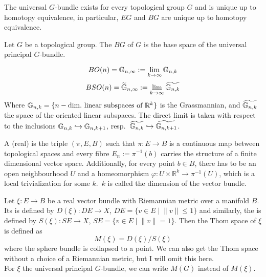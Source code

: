 \documentclass[a4paper,11pt]{article}
\begin{document}
\begin{remark}
    The universal \(G\)-bundle exists for every topological group \(G\) and is unique up to homotopy equivalence, in particular, \(EG\) and \(BG\) are unique up to homotopy equivalence.
\end{remark}

\begin{definition}
    Let \(G\) be a topological group. The  \(BG\) of \(G\) is the base space of the universal principal \(G\)-bundle.
\end{definition}

\begin{remark}\cite[p.32]{thom}
    \[BO(n)=\mathbb{G}_{n,\infty}:=\lim_{k\to\infty}\mathbb{G}_{n,k}\]
    \[BSO(n)=\widetilde{\mathbb{G}}_{n,\infty}:=\lim_{k\to\infty}\widetilde{\mathbb{G}_{n,k}}\]
    Where \(\mathbb{G}_{n,k}=\{n-\text{dim.\ linear subspaces of }\mathbb{R}^k\}\) is the Grassmannian, and \(\widetilde{\mathbb{G}_{n,k}}\) the space of the oriented linear subspaces. The direct limit is taken with respect to the inclusions \(\mathbb{G}_{n,k}\hookrightarrow\mathbb{G}_{n,k+1}\), resp.\ \(\widetilde{\mathbb{G}_{n,k}}\hookrightarrow\widetilde{\mathbb{G}_{n,k+1}}\).
\end{remark}

\begin{definition}
    A (real)  is the triple \((\pi,E,B)\) such that \(\pi:E\to B\) is a continuous map between topological spaces and every fibre \(E_n:=\pi^{-1}(b)\) carries the structure of a finite dimensional vector space.
    Additionally, for every point \(b\in B\), there has to be an open neighbourhood \(U\) and a homeomorphism \(\varphi:U\times\mathbb{R}^k\to\pi^{-1}(U)\), which is a local trivialization for some \(k\).\ \(k\) is called the dimension of the vector bundle.
\end{definition}

\begin{definition}[Thom space {\cite[p.29]{thom}}]%
    Let \(\xi:E\to B\) be a real vector bundle with Riemannian metric over a manifold \(B\). Its  is defined by \(D(\xi):DE\to X\), \(DE=\{v\in E\mid \lVert v\rVert \leq 1\}\) and similarly, the  is defined by \(S(\xi):SE\to X\), \(SE=\{v\in E\mid \lVert v\rVert = 1\}\). Then the Thom space of \(\xi\) is defined as
    \[M(\xi)=D(\xi)\big/S(\xi)\]
    where the sphere bundle is collapsed to a point. We can also get the Thom space without a choice of a Riemannian metric, but I will omit this here.\\
    For \(\xi\) the universal principal \(G\)-bundle, we can write \(M(G)\) instead of \(M(\xi)\).
\end{definition}
\end{document}
